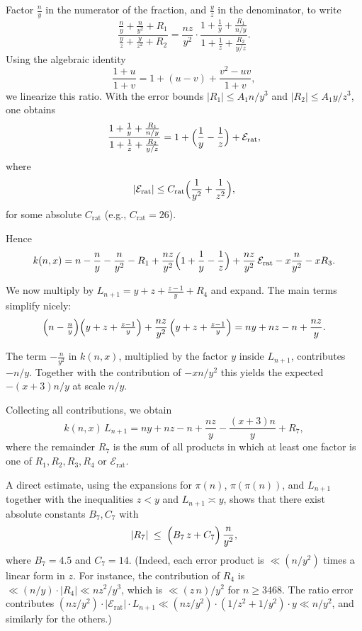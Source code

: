 \documentclass[10pt]{amsart}
\theoremstyle{definition} %
\numberwithin{equation}{section}
\begin{document}
\smallskip
Factor $\tfrac{n}{y}$ in the numerator of the fraction, and $\tfrac{y}{z}$ in
the denominator, to write
\[
\frac{\frac{n}{y}+\frac{n}{y^2}+R_1}{\frac{y}{z}+\frac{y}{z^2}+R_2}
=\frac{n z}{y^2}\cdot
  \frac{1+\frac{1}{y}+\frac{R_1}{n/y}}{1+\frac{1}{z}+\frac{R_2}{y/z}}.
\]
Using the algebraic identity
\[
\frac{1+u}{1+v}=1+(u-v)+\frac{v^2-uv}{1+v},
\]
we linearize this ratio. With the error bounds $|R_1|\le A_1 n/y^3$ and
$|R_2|\le A_1 y/z^3$, one obtains
\[
\frac{1+\frac{1}{y}+\frac{R_1}{n/y}}{1+\frac{1}{z}+\frac{R_2}{y/z}}
=1+\Bigl(\frac{1}{y}-\frac{1}{z}\Bigr)+\mathcal{E}_{\mathrm{rat}},
\]
where
\[
|\mathcal{E}_{\mathrm{rat}}|\le C_{\mathrm{rat}}\Bigl(\frac{1}{y^2}+\frac{1}{z^2}\Bigr),
\]
for some absolute $C_{\mathrm{rat}}$ (e.g., $C_{\mathrm{rat}}=26$).

\smallskip
Hence
\[
k(n,x)=n-\frac{n}{y}-\frac{n}{y^2}-R_1
+\frac{n z}{y^2}\Bigl(1+\frac{1}{y}-\frac{1}{z}\Bigr)
+\frac{n z}{y^2}\,\mathcal{E}_{\mathrm{rat}}
-x\frac{n}{y^2}-xR_3.
\]

\smallskip
We now multiply by $L_{n+1}=y+z+\tfrac{z-1}{y}+R_4$ and expand.  The main
terms simplify nicely:
\[
\Bigl(n-\tfrac{n}{y}\Bigr)\Bigl(y+z+\tfrac{z-1}{y}\Bigr)
+\frac{n z}{y^2}\,\Bigl(y+z+\tfrac{z-1}{y}\Bigr)
=ny+nz-n+\frac{n z}{y}.
\]

The term $-\tfrac{n}{y^2}$ in $k(n,x)$, multiplied by the factor $y$ inside
$L_{n+1}$, contributes $-n/y$. Together with the contribution of
$-x n/y^2$ this yields the expected $-(x+3)n/y$ at scale $n/y$.

\smallskip
Collecting all contributions, we obtain
\begin{equation}\label{eq:kL-main}
k(n,x)\,L_{n+1}
=ny+nz-n+\frac{n z}{y}-\frac{(x+3)n}{y}+R_7,
\end{equation}
where the remainder $R_7$ is the sum of all products in which at least one
factor is one of $R_1,R_2,R_3,R_4$ or $\mathcal{E}_{\mathrm{rat}}$.

A direct estimate, using the expansions for $\pi(n)$, $\pi(\pi(n))$, and
$L_{n+1}$ together with the inequalities $z<y$ and $L_{n+1}\asymp y$, shows
that there exist absolute constants $B_7,C_7$ with
\begin{equation}\label{eq:R7-bound}
|R_7|\;\le\; \Bigl(B_7\,z+C_7\Bigr)\,\frac{n}{y^2},
\end{equation}
where $B_7=4.5$ and $C_7=14$. (Indeed, each error product is $\ll (n/y^2)$ times a linear form in $z$. For
instance, the contribution of $R_4$ is
$\ll (n/y)\cdot|R_4|\ll n z^2/y^3$, which is $\ll (z\,n)/y^2$ for
$n\ge 3468$. The ratio error contributes
$(n z/y^2)\cdot|\mathcal{E}_{\mathrm{rat}}|\cdot L_{n+1}
\ll (n z/y^2)\cdot(1/z^2+1/y^2)\cdot y\ll n/y^2$, and similarly for the others.)
\end{document}
